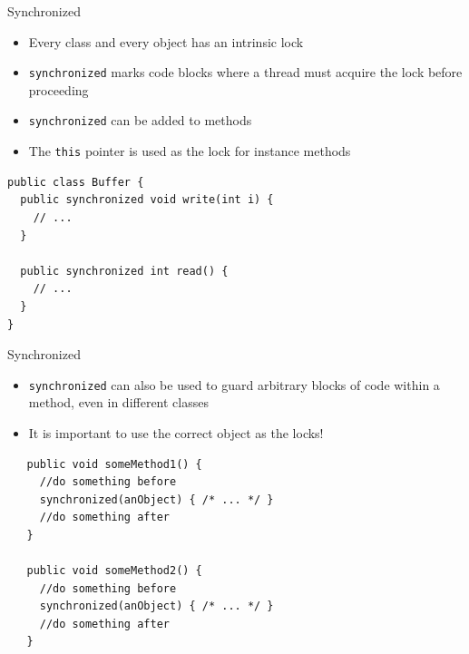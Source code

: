 \begin{frame}[fragile]{Synchronized}
  \begin{itemize}
  \item Every class and every object has an intrinsic lock
  \item \lstinline!synchronized! marks code blocks where a thread must
    acquire the lock before proceeding
  \item \lstinline!synchronized! can be added to methods
  \item The \lstinline!this! pointer is used as the lock for instance
    methods
  \end{itemize}


  \begin{lstlisting}
public class Buffer {
  public synchronized void write(int i) {
    // ... 
  }
  
  public synchronized int read() {
    // ... 
  }
}
  \end{lstlisting}
\end{frame}

\begin{frame}[fragile]{Synchronized}
  \begin{itemize}
  \item \lstinline{synchronized} can also be used to guard arbitrary
    blocks of code within a method, even in different classes
  \item It is important to use the correct object as the locks!
  \end{itemize}


 \begin{lstlisting}
   public void someMethod1() {
     //do something before
     synchronized(anObject) { /* ... */ }
     //do something after
   }

   public void someMethod2() {
     //do something before
     synchronized(anObject) { /* ... */ }
     //do something after
   }   
 \end{lstlisting}
\end{frame}

